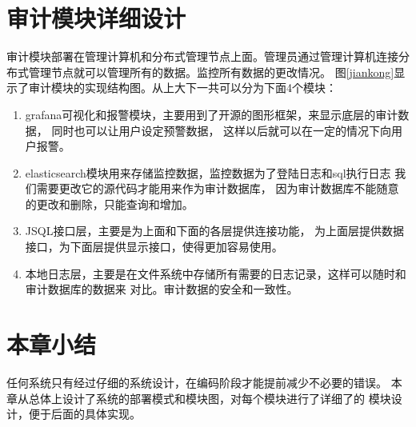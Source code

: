 \section{审计模块详细设计}
审计模块部署在管理计算机和分布式管理节点上面。管理员通过管理计算机连接分布式管理节点就可以管理所有的数据。监控所有数据的更改情况。
图\ref{jiankong}显示了审计模块的实现结构图。从上大下一共可以分为下面4个模块：
\begin{enumerate}
	\item grafana可视化和报警模块，主要用到了开源的图形框架，来显示底层的审计数据，
	同时也可以让用户设定预警数据，
	这样以后就可以在一定的情况下向用户报警。
	\item elasticsearch模块用来存储监控数据，监控数据为了登陆日志和sql执行日志
	我们需要更改它的源代码才能用来作为审计数据库，
	因为审计数据库不能随意的更改和删除，只能查询和增加。
	\item JSQL接口层，主要是为上面和下面的各层提供连接功能，
	为上面层提供数据接口，为下面层提供显示接口，使得更加容易使用。
	\item 本地日志层，主要是在文件系统中存储所有需要的日志记录，这样可以随时和审计数据库的数据来
	对比。审计数据的安全和一致性。
\end{enumerate}
\section{本章小结}
任何系统只有经过仔细的系统设计，在编码阶段才能提前减少不必要的错误。
本章从总体上设计了系统的部署模式和模块图，对每个模块进行了详细了的
模块设计，便于后面的具体实现。